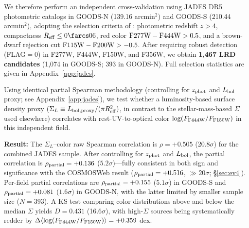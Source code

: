 \documentclass[twocolumn,linenumbers]{aastex631}
\begin{document}
We therefore perform an independent cross-validation using JADES DR5 photometric catalogs in GOODS-N (139.16 arcmin$^2$) and GOODS-S (210.44 arcmin$^2$), adopting the selection criteria of \citet{Rinaldi2026}: photometric redshift $z > 4$, compactness $R_{\rm eff} \leq 0\farcs06$, red color ${\rm F277W}-{\rm F444W} > 0.5$, and a brown-dwarf rejection cut ${\rm F115W}-{\rm F200W} > -0.5$. After requiring robust detection (FLAG$=0$) in F277W, F444W, F150W, and F356W, we obtain \textbf{1,467 LRD candidates} (1,074 in GOODS-S; 393 in GOODS-N). Full selection statistics are given in Appendix~\ref{app:jades}.

Using identical partial Spearman methodology (controlling for $z_{\rm phot}$ and $L_{\rm bol}$ proxy; see Appendix~\ref{app:jades}), we test whether a luminosity-based surface density proxy ($\Sigma_L \equiv L_{\rm bol, proxy} / (\pi R_{\rm eff}^2)$, in contrast to the stellar-mass-based $\Sigma$ used elsewhere) correlates with rest-UV-to-optical color $\log(F_{\rm F444W}/F_{\rm F150W})$ in this independent field.

\textbf{Result:} The $\Sigma_L$--color raw Spearman correlation is $\rho = +0.505$ (20.8$\sigma$) for the combined JADES sample. After controlling for $z_{\rm phot}$ and $L_{\rm bol}$, the partial correlation is $\rho_{\rm partial} = +0.136$ ($5.2\sigma$)---fully consistent in both sign and significance with the COSMOSWeb result ($\rho_{\rm partial} = +0.516$, ${\gg}20\sigma$; \S\ref{sec:ev4}). Per-field partial correlations are $\rho_{\rm partial} = +0.155$ ($5.1\sigma$) in GOODS-S and $\rho_{\rm partial} = +0.081$ ($1.6\sigma$) in GOODS-N, with the latter limited by smaller sample size ($N=393$). A KS test comparing color distributions above and below the median $\Sigma$ yields $D = 0.431$ (16.6$\sigma$), with high-$\Sigma$ sources being systematically redder by $\Delta\langle\log(F_{\rm F444W}/F_{\rm F150W})\rangle = +0.359$ dex.
\end{document}
